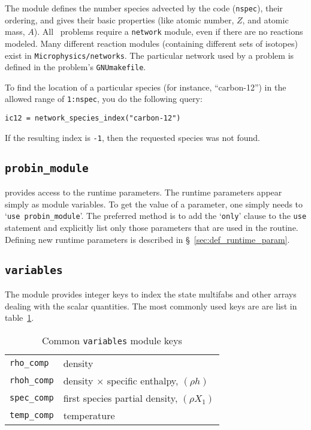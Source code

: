 The  module defines the number species advected by the
code ({\tt nspec}), their ordering, and gives their basic properties
(like atomic number, $Z$, and atomic mass, $A$).  All \maestro\ problems
require a {\tt network} module, even if there are no reactions
modeled.  Many different reaction modules (containing different sets
of isotopes) exist in {\tt Microphysics/networks}.  The particular network
used by a problem is defined in the problem's {\tt GNUmakefile}.

To find the location of a particular species (for instance, ``carbon-12'')
in the allowed range of {\tt 1:nspec}, you do the following query:
\begin{lstlisting}[language={[95]fortran},mathescape=false]
  ic12 = network_species_index("carbon-12")
\end{lstlisting}
If the resulting index is {\tt -1}, then the requested species was not
found.

\subsection{{\tt probin\_module}}

\label{sec:probin}

 provides access to the runtime parameters.
The runtime parameters appear simply as module variables.  To get the 
value of a parameter, one simply needs to `{\tt use probin\_module}'.
The preferred method is to add the `{\tt only}' clause to the
{\tt use} statement and explicitly list only those parameters that
are used in the routine.  Defining new runtime parameters is
described in \S~\ref{sec:def_runtime_param}.

\subsection{{\tt variables}}

\label{sec:variables_module}

The  module provides integer keys to index the state
multifabs and other arrays dealing with the scalar quantities.  The
most commonly used keys are are list in table~\ref{arch:table:variables}.

\begin{table}[h]
\caption{\label{arch:table:variables} Common {\tt variables} module keys}
\begin{center}
\begin{tabular}{ll}
\hline
{\tt rho\_comp}  & density \\
{\tt rhoh\_comp} & density $\times$ specific enthalpy, $(\rho h)$ \\
{\tt spec\_comp} & first species partial density, $(\rho X_1)$ \\
{\tt temp\_comp} & temperature \\
\hline
\end{tabular}
\end{center}
\end{table}

